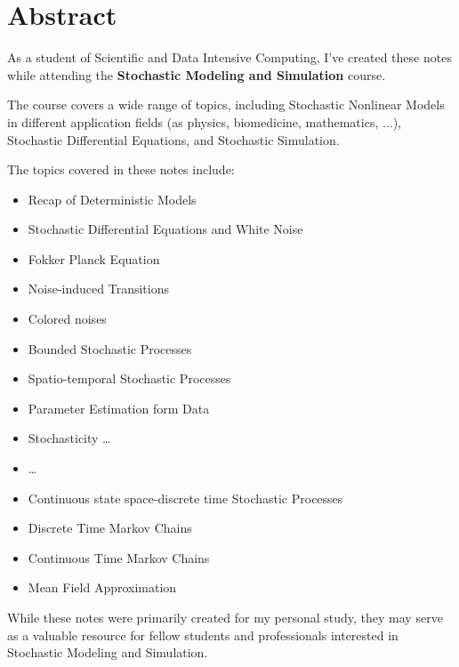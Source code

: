 \chapter*{Abstract}

As a student of Scientific and Data Intensive Computing, I've created these notes while attending the \textbf{Stochastic Modeling and Simulation} course.

The course covers a wide range of topics, including Stochastic Nonlinear Models in different application fields (as physics, biomedicine, mathematics, ...), Stochastic Differential Equations, and Stochastic Simulation.

\vspace{1em}

The topics covered in these notes include:

\begin{itemize}
\item Recap of Deterministic Models
\item Stochastic Differential Equations and White Noise
\item Fokker Planck Equation
\item Noise-induced Transitions
\item Colored noises
\item Bounded Stochastic Processes
\item Spatio-temporal Stochastic Processes
\item Parameter Estimation form Data
\item Stochasticity \dots
\item \dots
\item Continuous state space-discrete time Stochastic Processes
\item Discrete Time Markov Chains
\item Continuous Time Markov Chains
\item Mean Field Approximation
\end{itemize}

\vspace{1em}

While these notes were primarily created for my personal study, they may serve as a valuable resource for fellow students and professionals interested in Stochastic Modeling and Simulation.